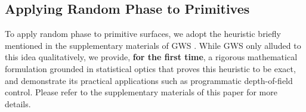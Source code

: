 \subsection{Applying Random Phase to Primitives}
To apply random phase to primitive surfaces, we adopt the heuristic briefly mentioned in the supplementary materials of GWS \cite{choi2025gaussian}. While GWS only alluded to this idea qualitatively, we provide, \textbf{for the first time}, a rigorous mathematical formulation grounded in statistical optics that proves this heuristic to be exact, and demonstrate its practical applications such as programmatic depth-of-field control. Please refer to the supplementary materials of this paper for more details.

